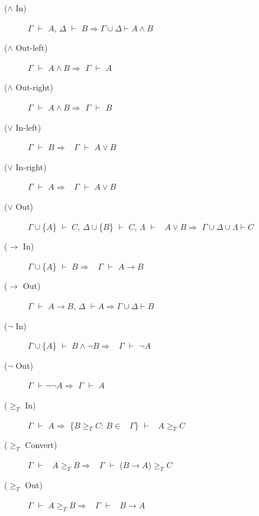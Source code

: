\begin{description}

\item [(\(\wedge\) In)]  \(\Gamma\) \(\vdash\) \(A\), \(\Delta\) \(\vdash\) \(B \Rightarrow \Gamma \cup\Delta \vdash A \wedge B\)

\item [(\(\wedge\) Out-left)]  \(\Gamma\)  \(\vdash\)  \(A \wedge B \Rightarrow\)  \(\Gamma\) \(\vdash\) \(A\)

\item [(\(\wedge\) Out-right)]  \(\Gamma\)  \(\vdash\)  \(A \wedge B \Rightarrow\)  \(\Gamma\) \(\vdash\) \(B\)

\item [(\(\vee\) In-left)]  \(\Gamma\) \(\vdash\) \(B \Rightarrow\)~ \(\Gamma\) \(\vdash\) \(A \vee B\)

\item [(\(\vee\) In-right)]  \(\Gamma\) \(\vdash\) \(A \Rightarrow\)~ \(\Gamma\) \(\vdash\) \(A \vee B\)

\item [(\(\vee\) Out)]  \(\Gamma \cup\)\{\(A\)\} \(\vdash\) \(C\), \(\Delta \cup\)\{\(B\)\} \(\vdash\) \(C\), \(\Lambda\)  \(\vdash\) ~\(A \vee B \Rightarrow\) \(\Gamma \cup \Delta \cup \Lambda \vdash C\)

\item [(\(\rightarrow\) In)]  \(\Gamma \cup\)\{\(A\)\} \(\vdash\) \(B \Rightarrow\)~ \(\Gamma\) \(\vdash\) \(A \rightarrow B\)

\item [(\(\rightarrow\) Out)]  \(\Gamma\) \(\vdash\) \(A \rightarrow B\), \(\Delta\) \(\vdash A \Rightarrow \Gamma \cup \Delta \vdash B\)

\item [(\(\neg\) In)]  \(\Gamma \cup\)\{\(A\)\} \(\vdash\) \(B \wedge \neg B \Rightarrow\)~ \(\Gamma\) \(\vdash\) \(\neg A\)

\item [(\(\neg\) Out)]  \(\Gamma\) \(\vdash \neg \neg A \Rightarrow\) \(\Gamma\) \(\vdash\) \(A\)

\item [(\(\geqslant _T\) In)]  \(\Gamma\) \(\vdash\) \(A \Rightarrow\) \{\(B \geqslant _T C\): \(B \in\)~ \(\Gamma\)\}  \(\vdash\) ~\(A \geqslant _T C\)

\item [(\(\geqslant _T\) Convert)]  \(\Gamma\)  \(\vdash\) ~\(A \geqslant _T B \Rightarrow\)~ \(\Gamma\) \(\vdash\) (\(B \rightarrow A\))\(\geqslant _T C\)

\item [(\(\geqslant _T\) Out)]  \(\Gamma\) \(\vdash\) \(A \geqslant _T B \Rightarrow\)~ \(\Gamma\)  \(\vdash\) ~\(B \rightarrow A\)
\end{description}

